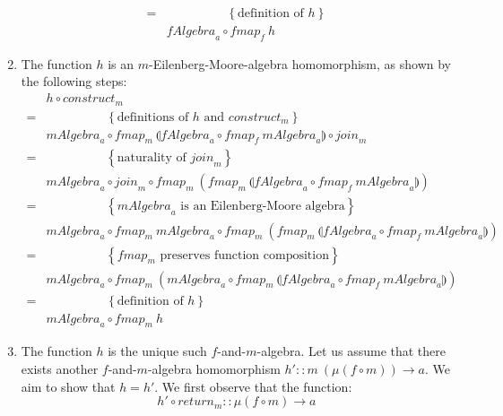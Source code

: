 \documentclass{jfp1}
\newcommand{\fold}[1]{\llparenthesis #1 \rrparenthesis}
\newcommand{\eqAnnotation}[1]{\hspace{2cm}\left\{\textrm{#1}\right\}}
\begin{document}
\begin{proof*}
\begin{enumerate}
\begin{displaymath}
\begin{array}{cl}
        =&\eqAnnotation{definition of $h$} \\
         & \mathit{fAlgebra}_a \circ \mathit{fmap}_f~h
      \end{array}
    \end{displaymath}
  \item The function $h$ is an $m$-Eilenberg-Moore-algebra
    homomorphism, as shown by the following steps:
    \begin{displaymath}
      \begin{array}{cl}
        & h \circ \mathit{construct_m} \\
        =&\eqAnnotation{definitions of $h$ and $\mathit{construct}_m$} \\
         &\mathit{mAlgebra}_a \circ \mathit{fmap}_m~\fold{\mathit{fAlgebra}_a \circ \mathit{fmap}_f~\mathit{mAlgebra}_a} \circ \mathit{join}_m \\
        =&\eqAnnotation{naturality of $\mathit{join}_m$} \\
         &\mathit{mAlgebra}_a \circ \mathit{join}_m \circ \mathit{fmap}_m~(\mathit{fmap}_m~\fold{\mathit{fAlgebra}_a \circ \mathit{fmap}_f~\mathit{mAlgebra}_a}) \\
        =&\eqAnnotation{$\mathit{mAlgebra}_a$ is an Eilenberg-Moore algebra} \\
         &\mathit{mAlgebra}_a \circ \mathit{fmap}_m~\mathit{mAlgebra}_a \circ \mathit{fmap}_m~(\mathit{fmap}_m~\fold{\mathit{fAlgebra}_a \circ \mathit{fmap}_f~\mathit{mAlgebra}_a}) \\
        =&\eqAnnotation{$\mathit{fmap}_m$ preserves function composition} \\
         &\mathit{mAlgebra}_a \circ \mathit{fmap}_m~(\mathit{mAlgebra}_a \circ \mathit{fmap}_m~\fold{\mathit{fAlgebra}_a \circ \mathit{fmap}_f~\mathit{mAlgebra}_a}) \\
        =&\eqAnnotation{definition of $h$} \\
         &\mathit{mAlgebra}_a \circ \mathit{fmap}_m~h
      \end{array}
    \end{displaymath}
  \item The function $h$ is the unique such $f$-and-$m$-algebra. Let
    us assume that there exists another $f$-and-$m$-algebra
    homomorphism $h' :: m~(\mu(f \circ m)) \to a$. We aim to show that
    $h = h'$. We first observe that the function:
    \begin{displaymath}
      h' \circ \mathit{return}_m :: \mu(f \circ m) \to a
    \end{displaymath}

\end{enumerate}
\end{proof*}
\end{document}

